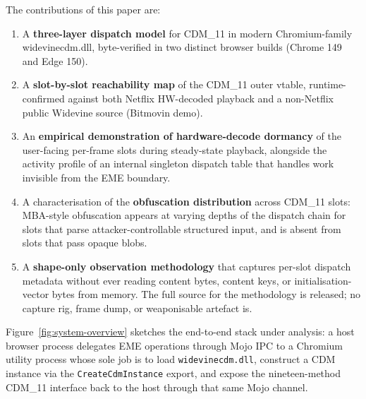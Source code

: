 \documentclass[11pt,letterpaper]{article}
\begin{document}
The contributions of this paper are:
\begin{enumerate}[itemsep=2pt,topsep=2pt]
  \item A \textbf{three-layer dispatch model} for CDM\_11 in modern
        Chromium-family widevinecdm.dll, byte-verified in two distinct
        browser builds (Chrome 149 and Edge 150).
  \item A \textbf{slot-by-slot reachability map} of the CDM\_11 outer
        vtable, runtime-confirmed against both Netflix HW-decoded
        playback and a non-Netflix public Widevine source (Bitmovin
        demo).
  \item An \textbf{empirical demonstration of hardware-decode
        dormancy} of the user-facing per-frame slots during
        steady-state playback, alongside the activity profile of an
        internal singleton dispatch table that handles work invisible
        from the EME boundary.
  \item A characterisation of the \textbf{obfuscation distribution}
        across CDM\_11 slots: MBA-style obfuscation appears at varying
        depths of the dispatch chain for slots that parse
        attacker-controllable structured input, and is absent from
        slots that pass opaque blobs.
  \item A \textbf{shape-only observation methodology} that captures
        per-slot dispatch metadata without ever reading content
        bytes, content keys, or initialisation-vector bytes from
        memory.  The full source for the methodology is released; no
        capture rig, frame dump, or weaponisable artefact is.
\end{enumerate}

Figure~\ref{fig:system-overview} sketches the end-to-end stack
under analysis: a host browser process delegates EME operations
through Mojo IPC to a Chromium utility process whose sole job is to
load \texttt{widevinecdm.dll}, construct a CDM instance via the
\texttt{CreateCdmInstance} export, and expose the nineteen-method
CDM\_11 interface back to the host through that same Mojo channel.
\end{document}
